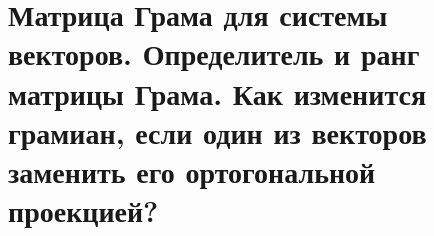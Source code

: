 \section{
    Матрица Грама для системы векторов. Определитель и ранг матрицы Грама. Как изменится грамиан, если один из векторов заменить его ортогональной проекцией?
}
